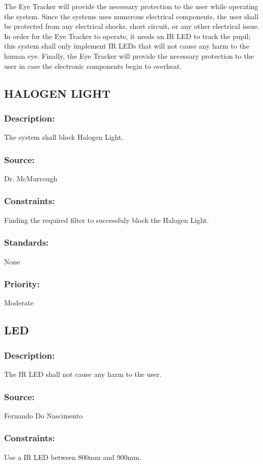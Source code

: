 The Eye Tracker will provide the necessary protection to the user while operating the system. Since the systems uses numerous electrical components, the user shall be protected from any electrical shocks, short circuit, or any other electrical issue. In order for the Eye Tracker to operate, it needs an IR LED to track the pupil; this system shall only implement IR LEDs that will not cause any harm to the human eye. Finally, the Eye Tracker will provide the necessary protection to the user in case the electronic components begin to overheat.

\subsection{\text HALOGEN LIGHT}
\subsubsection{Description:} 
	{ The system shall block Halogen Light.}
\subsubsection{Source:} 
	{Dr. McMurrough}
\subsubsection{Constraints:} 
	{Finding the required filter to successfuly block the Halogen Light.}
\subsubsection{Standards:} 
	{None}
\subsubsection{Priority:} 
	{Moderate}

\subsection{\text LED}
\subsubsection{Description:} 
	{The IR LED shall not cause any harm to the user.}
\subsubsection{Source:} 
	{Fernando Do Nascimento}
\subsubsection{Constraints:} 
	{Use a IR LED between 800mm and 900mm.}

